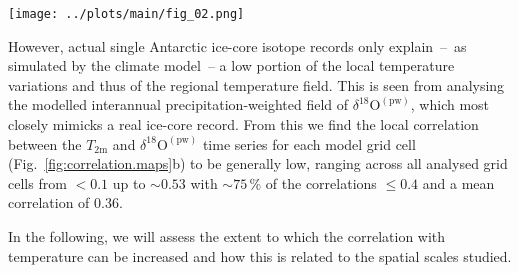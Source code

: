 \documentclass[cp, manuscript]{copernicus}
\begin{document}
\begin{figure*}[t]%
\centering
\texttt{[image: ../plots/main/fig\_02.png]}
\caption{%
  Temperature decorrelation lengths and temperature--isotope
  relationship. (\textbf{a}) The temperature decorrelation lengths ($\tau$, in
  km) for each Antarctic model grid cell estimated by fitting an exponential
  model to the correlation--distance relationship (cf. Eq.~\ref{eq:t2m.decorr})
  obtained from correlating the local interannual near-surface $T_{2\mathrm{m}}$
  time series with the respective temperature time series from all other grid
  cells. Note that only continental grid cells are used for the fit.
  (\textbf{b}) The local correlation between the interannual near-surface
  temperature ($T_{2\mathrm{m}}$) and precipitation-weighted oxygen isotope
  composition ($\delta^{18}\mathrm{O}^{\mathrm{(pw)}}$) time series for each
  Antarctic model grid cell.}
\label{fig:correlation.maps}%
\end{figure*}%

However, actual single Antarctic ice-core isotope records only explain~--~as
simulated by the climate model~-- a low portion of the local temperature
variations and thus of the regional temperature field. This is seen from
analysing the modelled interannual precipitation-weighted field of
$\delta^{18}\mathrm{O}^{\mathrm{(pw)}}$, which most closely mimicks a real
ice-core record. From this we find the local correlation between the
$T_{2\mathrm{m}}$ and $\delta^{18}\mathrm{O}^{\mathrm{(pw)}}$ time series for
each model grid cell (Fig.~\ref{fig:correlation.maps}b) to be generally low,
ranging across all analysed grid cells from $<0.1$ up to $\sim0.53$ with
$\sim75\,\%$ of the correlations $\leq0.4$ and a mean correlation of $0.36$.

In the following, we will assess the extent to which the correlation with
temperature can be increased and how this is related to the spatial scales
studied.
\end{document}
